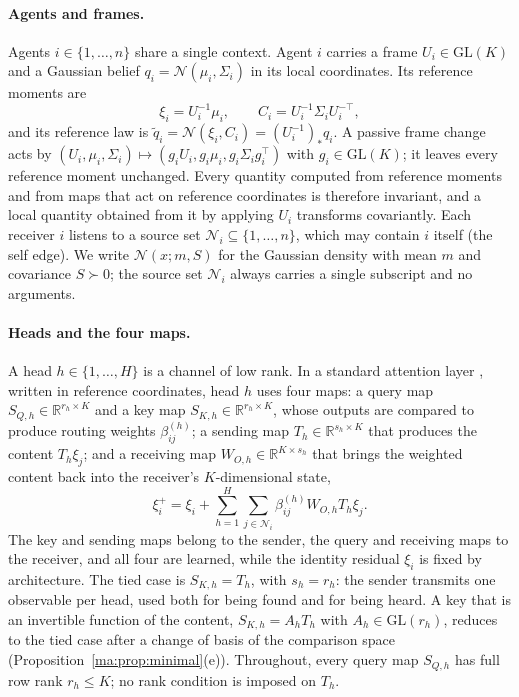 \documentclass[11pt]{article}
\theoremstyle{definition}
\theoremstyle{remark}
\providecommand{\GL}{\mathrm{GL}}
\newcommand{\R}{\mathbb R}
\newcommand{\Nset}{\mathcal N}
\newcommand{\Gauss}{\mathcal N}
\newcommand{\qt}{\widetilde q}
\begin{document}
\paragraph{Agents and frames.}
Agents $i\in\{1,\ldots,n\}$ share a single context. Agent $i$ carries a frame $U_i\in\GL(K)$ and a Gaussian belief $q_i=\Gauss(\mu_i,\Sigma_i)$ in its local coordinates. Its reference moments are
\begin{equation}
\xi_i=U_i^{-1}\mu_i,\qquad C_i=U_i^{-1}\Sigma_iU_i^{-\top},
\label{ma:eq:reference}
\end{equation}
and its reference law is $\qt_i=\Gauss(\xi_i,C_i)=(U_i^{-1})_*q_i$. A passive frame change acts by $(U_i,\mu_i,\Sigma_i)\mapsto(g_iU_i,g_i\mu_i,g_i\Sigma_ig_i^\top)$ with $g_i\in\GL(K)$; it leaves every reference moment unchanged. Every quantity computed from reference moments and from maps that act on reference coordinates is therefore invariant, and a local quantity obtained from it by applying $U_i$ transforms covariantly. Each receiver $i$ listens to a source set $\Nset_i\subseteq\{1,\ldots,n\}$, which may contain $i$ itself (the self edge). We write $\Gauss(x;m,S)$ for the Gaussian density with mean $m$ and covariance $S\succ0$; the source set $\Nset_i$ always carries a single subscript and no arguments.

\paragraph{Heads and the four maps.}
A head $h\in\{1,\ldots,H\}$ is a channel of low rank. In a standard attention layer \citep{vaswani2017attention}, written in reference coordinates, head $h$ uses four maps: a query map $S_{Q,h}\in\R^{r_h\times K}$ and a key map $S_{K,h}\in\R^{r_h\times K}$, whose outputs are compared to produce routing weights $\beta^{(h)}_{ij}$; a sending map $T_h\in\R^{s_h\times K}$ that produces the content $T_h\xi_j$; and a receiving map $W_{O,h}\in\R^{K\times s_h}$ that brings the weighted content back into the receiver's $K$-dimensional state,
\begin{equation}
\xi_i^+=\xi_i+\sum_{h=1}^H\sum_{j\in\Nset_i}\beta^{(h)}_{ij}W_{O,h}T_h\xi_j.
\label{ma:eq:four_map}
\end{equation}
The key and sending maps belong to the sender, the query and receiving maps to the receiver, and all four are learned, while the identity residual $\xi_i$ is fixed by architecture. The tied case is $S_{K,h}=T_h$, with $s_h=r_h$: the sender transmits one observable per head, used both for being found and for being heard. A key that is an invertible function of the content, $S_{K,h}=A_hT_h$ with $A_h\in\GL(r_h)$, reduces to the tied case after a change of basis of the comparison space (Proposition~\ref{ma:prop:minimal}(e)). Throughout, every query map $S_{Q,h}$ has full row rank $r_h\le K$; no rank condition is imposed on $T_h$.
\end{document}
